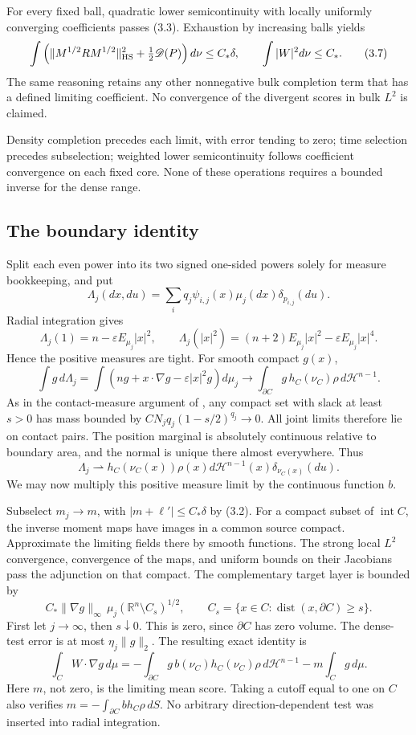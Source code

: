 \documentclass[11pt,reqno]{amsart}
\numberwithin{equation}{section}
\theoremstyle{remark}
\theoremstyle{definition}
\begin{document}
For every fixed ball, quadratic lower semicontinuity with locally uniformly converging coefficients passes (3.3). Exhaustion by increasing balls yields
\[
\int\left(\|M^{1/2}RM^{1/2}\|_{\rm HS}^2+
\tfrac12\mathscr D(P)\right)d\nu\le C_*\delta,\qquad
\int|W|^2d\nu\le C_*.                                                \tag{3.7}
\]
The same reasoning retains any other nonnegative bulk completion term that has a defined limiting coefficient. No convergence of the divergent scores in bulk \(L^2\) is claimed.

Density completion precedes each limit, with error tending to zero; time selection precedes subselection; weighted lower semicontinuity follows coefficient convergence on each fixed core. None of these operations requires a bounded inverse for the dense range.

\subsection{The boundary identity}

Split each even power into its two signed one-sided powers solely for measure bookkeeping, and put
\[
\Lambda_j(dx,du)=\sum_iq_j\psi_{i,j}(x)\mu_j(dx)\delta_{p_{i,j}}(du).
\]
Radial integration gives
\[
\Lambda_j(1)=n-\varepsilon E_{\mu_j}|x|^2,\qquad
\Lambda_j(|x|^2)=(n+2)E_{\mu_j}|x|^2-\varepsilon E_{\mu_j}|x|^4.
\]
Hence the positive measures are tight. For smooth compact \(g(x)\),
\[
\int g\,d\Lambda_j
=\int(ng+x\cdot\nabla g-\varepsilon |x|^2g)d\mu_j
\longrightarrow \int_{\partial C}g\,h_C(\nu_C)\rho\,d\mathcal H^{n-1}.
\]
As in the contact-measure argument of \cite[section 3.3]{LSX}, any compact set with slack at least \(s>0\) has mass bounded by \(C N_jq_j(1-s/2)^{q_j}\to0\). All joint limits therefore lie on contact pairs. The position marginal is absolutely continuous relative to boundary area, and the normal is unique there almost everywhere. Thus
\[
\Lambda_j\rightharpoonup
h_C(\nu_C(x))\rho(x)d\mathcal H^{n-1}(x)\delta_{\nu_C(x)}(du).
\]
We may now multiply this positive measure limit by the continuous function $b$.

Subselect \(m_j\to m\), with \(|m+\ell'|\le C_*\delta\) by (3.2). For a compact subset of $\operatorname{int}C$, the inverse moment
maps have images in a common source compact. Approximate the limiting
fields there by smooth functions. The strong local $L^2$ convergence,
convergence of the maps, and uniform bounds on their Jacobians pass
the adjunction on that compact. The complementary target layer is bounded by
\[
C_*\|\nabla g\|_\infty\,\mu_j(\mathbb R^n\setminus C_s)^{1/2},
\qquad C_s=\{x\in C:\operatorname{dist}(x,\partial C)\ge s\}.
\]
First let \(j\to\infty\), then \(s\downarrow0\). This is zero, since \(\partial C\) has zero volume. The dense-test error is at most \(\eta_j\|g\|_2\). The resulting exact identity is
\[
\boxed{\ \int_C W\cdot\nabla g\,d\mu
=-\int_{\partial C}g\,b(\nu_C)h_C(\nu_C)\rho\,d\mathcal H^{n-1}
-m\int_Cg\,d\mu.\ }                                                   \tag{3.8}
\]
Here \(m\), not zero, is the limiting mean score. Taking a cutoff equal to one on \(C\) also verifies \(m=-\int_{\partial C}b h_C\rho\,dS\). No arbitrary direction-dependent test was inserted into radial integration.
\end{document}
